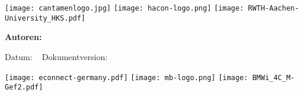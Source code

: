 \begin{titlepage}

\begin{center}
\texttt{[image: cantamenlogo.jpg]}
\texttt{[image: hacon-logo.png]}
\texttt{[image: RWTH-Aachen-University\_HKS.pdf]}
\end{center}

\vspace{1em}


\begin{huge}
\bfseries\center
\thistitle

\end{huge}

\vspace{1em}

\begin{large}
\bfseries\noindent Autoren:\\
\thisauthor

\end{large}

\vspace{1em}

Datum: \thisdate ~ Dokumentversion: \thisversion

\vspace{2em}

\thisabstract
\vspace{2em}
\vfill

\texttt{[image: econnect-germany.pdf]} \hspace{1.5em}
\texttt{[image: mb-logo.png]}
\hfill \texttt{[image: BMWi\_4C\_M-Gef2.pdf]}


\end{titlepage}
